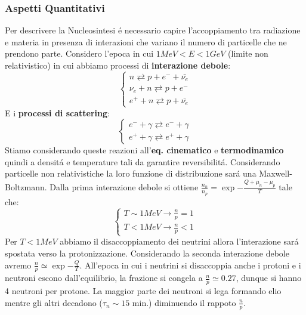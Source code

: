\documentclass[12pt, a4paper]{article}
\begin{document}
\subsubsection{Aspetti Quantitativi}
Per descrivere la Nucleosintesi \'{e} necessario capire l'accoppiamento tra radiazione e materia in presenza di interazioni che variano il numero di particelle che ne prendono parte. Considero l'epoca in cui $1MeV<E<1GeV$ (limite non relativistico) in cui abbiamo processi di \textbf{interazione debole}:
\begin{equation}
    \begin{cases}
    n \rightleftarrows p + e^{-} + \bar{\nu_e}
    \\
    \nu_{e}+n \rightleftarrows p +e^{-}
    \\
    e^{+} + n\rightleftarrows p + \bar{\nu_e}
    \end{cases}
\end{equation}
E i \textbf{processi di scattering}:
\begin{equation}
    \begin{cases}
    e^{-} + \gamma \rightleftarrows e^{-} + \gamma
    \\
    e^{+} + \gamma \rightleftarrows e^{+} + \gamma
    \end{cases}
\end{equation}
Stiamo considerando queste reazioni all'\textbf{eq. cinematico} e \textbf{termodinamico} quindi a densit\'{a} e temperature tali da garantire reversibilit\'{a}. Considerando particelle non relativistiche la loro funzione di distribuzione sar\'{a} una Maxwell-Boltzmann. Dalla prima interazione debole si ottiene $\frac{n_n}{n_p} = \exp{-\frac{Q + \mu_n -\mu_p}{T}}$ tale che:\\
\begin{equation}
    \begin{cases}
    T \sim 1MeV \rightarrow \frac{n}{p}=1
    \\
    T < 1MeV \rightarrow \frac{n}{p}<1
    \end{cases}
\end{equation}
Per $T < 1MeV$ abbiamo il disaccoppiamento dei neutrini allora l'interazione sar\'{a} spostata verso la protonizzazione. Considerando la seconda interazione debole avremo $\frac{n}{p} \simeq \exp{-\frac{Q }{T}}$. All'epoca in cui i neutrini si disaccoppia anche i protoni e i neutroni escono dall'equilibrio, la frazione si congela a $\frac{n}{p} \simeq 0.27$, dunque si hanno 4 neutroni per protone. La maggior parte dei neutroni si lega formando elio mentre gli altri decadono ($\tau_n\sim 15$ min.) diminuendo il rappoto $\frac{n}{p}$.\\
\end{document}
